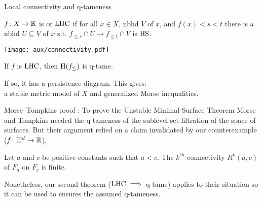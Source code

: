 \begin{frame}{Local connectivity and q-tameness}
	\pause
	\begin{minipage}{0.5\textwidth}
		$f \colon X \to \mathbb{R}$ is  or $\mathrm{LHC}$ if for all $x \in X$, nbhd $V$ of $x$, and $f(x) < s < t$ there is a nbhd $U \subseteq V$ of $x$ s.t. $f_{\leq s} \cap U \to f_{\leq t} \cap V$ is $\mathrm{HS}$.
	\end{minipage}
	\begin{minipage}{0.4\textwidth}
		\hspace*{.5cm}\texttt{[image: aux/connectivity.pdf]}
	\end{minipage}

	\bigskip\pause

	\begin{theorem}[BMS 2021]
		If $f$ is $\mathrm{LHC}$, then $\mathrm{H}(f_{\le})$ is q-tame.
	\end{theorem}

	\smallskip\pause
	If so, it has a persistence diagram.
	This gives: \\
	a stable metric model of $X$ and generalized Morse inequalities.
\end{frame}

\begin{frame}{Morse--Tompkins proof}
	: To prove the Unstable Minimal Surface Theorem Morse and Tompkins needed the q-tameness of the sublevel set filtration of the space of surfaces.
	But their argument relied on a claim invalidated by our counterexample ($f \colon \mathbb{H}^d \to \mathbb{R}$).

	\begin{displayquote}[Morse 1940]
		Let $a$ and $c$ be positive constants such that $a < c$.
		The $k^{\mathrm{th}}$ connectivity $R^k(a,c)$ of $F_a$ on $F_c$ is finite.
	\end{displayquote}

	Nonetheless, our second theorem ($\mathrm{LHC} \implies$ q-tame) applies to their situation so it can be used to ensures the assumed q-tameness.
\end{frame}

